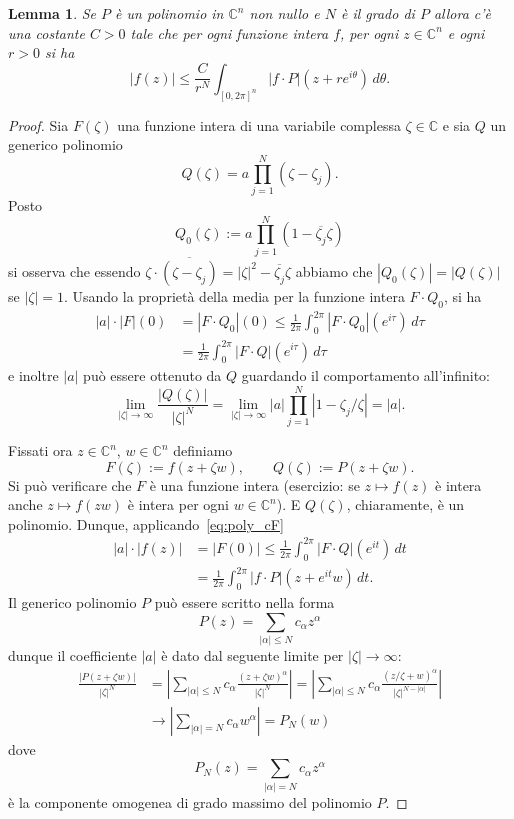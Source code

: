\documentclass[italian,a4paper,oneside,headinclude]{scrbook}
\newcommand{\CC}{\mathbb C}
\newcommand{\abs}[1]{{\left|#1\right|}}
\newcommand{\defeq}{:=}
\newtheorem{lemma}[theorem]{Lemma}
\begin{document}
\begin{lemma}\label{lm:poly_grow}
  Se $P$ è un polinomio in $\CC^n$ non nullo e $N$ è il grado di $P$
  allora c'è una costante
  $C>0$ tale che per ogni funzione intera $f$, per ogni $z\in \CC^n$ e
  ogni $r>0$ si ha
  \[
  \abs{f(z)} \le \frac{C}{r^N}\int_{[0,2\pi]^n}
  \abs{f\cdot P}(z+re^{i\theta})\, d\theta.
  \]
\end{lemma}
%
\begin{proof}
  Sia $F(\zeta)$ una funzione intera di una variabile complessa
  $\zeta\in \CC$ e sia $Q$ un generico polinomio
  \[
  Q(\zeta) = a \prod_{j=1}^N (\zeta - \zeta_j).
  \]
  Posto
  \[
  Q_0(\zeta) \defeq a \prod_{j=1}^N (1-\overline{\zeta_j}\zeta)
  \]
  si osserva che essendo
  $\zeta\cdot \overline{(\zeta - \zeta_j)} = \abs{\zeta}^2 -
  \overline{\zeta_j}\zeta$
  abbiamo che
  $\abs{Q_0(\zeta)} = \abs{Q(\zeta)}$ se $\abs{\zeta}=1$.
  Usando la proprietà della media per la funzione intera
  $F\cdot Q_0$, si ha
  \begin{equation}\label{eq:poly_cF}
  \begin{aligned}
  \abs{a}\cdot \abs{F}(0)
  &= \abs{F\cdot Q_0}(0)
  \le \frac{1}{2\pi}\int_0^{2\pi} \abs{F\cdot Q_0}(e^{i\tau})\,
  d\tau\\
  &= \frac{1}{2\pi}\int_0^{2\pi} \abs{F\cdot Q}(e^{i \tau})\, d\tau
  \end{aligned}
  \end{equation}
  e inoltre $\abs{a}$ può essere ottenuto da $Q$ guardando il
  comportamento all'infinito:
  \[
  \lim_{\abs{\zeta}\to \infty} \frac{\abs{Q(\zeta)}}{\abs{\zeta}^N}
  = \lim_{\abs{\zeta}\to \infty} \abs{a}\prod_{j=1}^N \abs{1 -
    \zeta_j/\zeta}
  = \abs{a}.
  \]

  Fissati ora $z\in \CC^n$, $w\in \CC^n$ definiamo
  \[
  F(\zeta) \defeq f(z+\zeta w),
  \qquad
  Q(\zeta) \defeq P(z+\zeta w).
  \]
  Si può verificare che $F$ è una funzione intera (esercizio: se
  $z\mapsto f(z)$ è intera anche $z\mapsto f(zw)$ è intera per ogni
  $w\in \CC^n$). E $Q(\zeta)$, chiaramente, è un polinomio.
  Dunque, applicando~\eqref{eq:poly_cF}
  \begin{align*}
    \abs{a}\cdot \abs{f(z)}
    &= \abs{F(0)}
    \le \frac{1}{2\pi} \int_0^{2\pi} \abs{F\cdot Q}(e^{i t})\,
    d t\\
    &= \frac{1}{2\pi} \int_0^{2\pi}\abs{f\cdot
      P}(z+e^{it}w)\, d t.
  \end{align*}
  Il generico polinomio $P$ può essere scritto nella forma
  \[
    P(z) = \sum_{\abs{\alpha}\le N} c_\alpha z^\alpha
  \]
  dunque il coefficiente $\abs{a}$ è dato dal seguente limite
  per $\abs{\zeta}\to \infty$:
  \begin{align*}
    \frac{\abs{P(z+\zeta w)}}{\abs{\zeta}^N}
    &= \abs{\sum_{\abs{\alpha}\le N} c_\alpha \frac{(z+\zeta
        w)^\alpha}{\abs{\zeta}^N}}
    = \abs{\sum_{\abs{\alpha}\le N} c_\alpha \frac{(z/\zeta + w)^\alpha}{\abs{\zeta}^{N-\abs{\alpha}}}}\\
    &\to \abs{\sum_{\abs{\alpha}=N} c_\alpha w^\alpha}
     = P_N(w)
  \end{align*}
  dove
  \[
  P_N(z) = \sum_{\abs{\alpha}=N} c_\alpha z^\alpha
  \]
  è la componente omogenea di grado massimo del polinomio $P$.


\end{proof}
\end{document}
